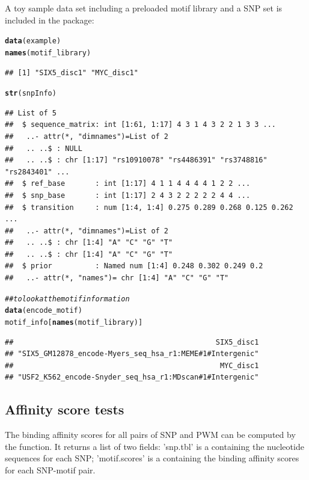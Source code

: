 \documentclass[a4paper,10pt]{article}\usepackage[]{graphicx}\usepackage[]{color}
\makeatletter
\newcommand{\hlcom}[1]{\textcolor[rgb]{0.678,0.584,0.686}{\textit{#1}}}%
\newcommand{\hlstd}[1]{\textcolor[rgb]{0.345,0.345,0.345}{#1}}%
\newcommand{\hlkwd}[1]{\textcolor[rgb]{0.737,0.353,0.396}{\textbf{#1}}}%
\newenvironment{kframe}{%
 \def\at@end@of@kframe{}%
 \ifinner\ifhmode%
  \def\at@end@of@kframe{\end{minipage}}%
  \begin{minipage}{\columnwidth}%
 \fi\fi%
 \def\FrameCommand##1{\hskip\@totalleftmargin \hskip-\fboxsep
 \colorbox{shadecolor}{##1}\hskip-\fboxsep
     \hskip-\linewidth \hskip-\@totalleftmargin \hskip\columnwidth}%
 \MakeFramed {\advance\hsize-\width
   \@totalleftmargin\z@ \linewidth\hsize
   \@setminipage}}%
 {\par\unskip\endMakeFramed%
 \at@end@of@kframe}
\newenvironment{knitrout}{}{} %
\makeatother
\begin{document}
A toy sample data set including a preloaded motif library and a SNP set is included in the package:

\begin{knitrout}
\color{fgcolor}\begin{kframe}
\begin{alltt}
\hlkwd{data}\hlstd{(example)}
\hlkwd{names}\hlstd{(motif_library)}
\end{alltt}
\begin{verbatim}
## [1] "SIX5_disc1" "MYC_disc1"
\end{verbatim}
\begin{alltt}
\hlkwd{str}\hlstd{(snpInfo)}
\end{alltt}
\begin{verbatim}
## List of 5
##  $ sequence_matrix: int [1:61, 1:17] 4 3 1 4 3 2 2 1 3 3 ...
##   ..- attr(*, "dimnames")=List of 2
##   .. ..$ : NULL
##   .. ..$ : chr [1:17] "rs10910078" "rs4486391" "rs3748816" "rs2843401" ...
##  $ ref_base       : int [1:17] 4 1 1 4 4 4 4 1 2 2 ...
##  $ snp_base       : int [1:17] 2 4 3 2 2 2 2 2 4 4 ...
##  $ transition     : num [1:4, 1:4] 0.275 0.289 0.268 0.125 0.262 ...
##   ..- attr(*, "dimnames")=List of 2
##   .. ..$ : chr [1:4] "A" "C" "G" "T"
##   .. ..$ : chr [1:4] "A" "C" "G" "T"
##  $ prior          : Named num [1:4] 0.248 0.302 0.249 0.2
##   ..- attr(*, "names")= chr [1:4] "A" "C" "G" "T"
\end{verbatim}
\begin{alltt}
\hlcom{## to look at the motif information}
\hlkwd{data}\hlstd{(encode_motif)}
\hlstd{motif_info[}\hlkwd{names}\hlstd{(motif_library)]}
\end{alltt}
\begin{verbatim}
##                                               SIX5_disc1 
## "SIX5_GM12878_encode-Myers_seq_hsa_r1:MEME#1#Intergenic" 
##                                                MYC_disc1 
## "USF2_K562_encode-Snyder_seq_hsa_r1:MDscan#1#Intergenic"
\end{verbatim}
\end{kframe}
\end{knitrout}


\subsection{Affinity score tests}

The binding affinity scores for all pairs of SNP and PWM can be computed by the  function. It returns a list of two fields: 'snp.tbl' is a  containing the nucleotide sequences for each SNP; 'motif.scores' is a  containing the binding affinity scores for each SNP-motif pair.
\end{document}
